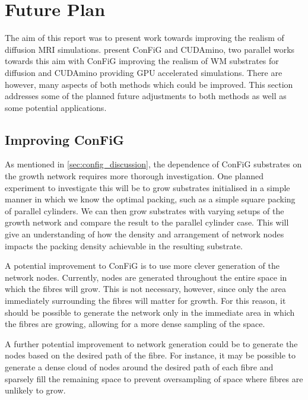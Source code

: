 \chapter{Future Plan}
\label{sec:future}

The aim of this report was to present work towards improving the realism of diffusion MRI simulations.
 present \ac{ConFiG} and CUDAmino, two parallel works towards this aim with \ac{ConFiG} improving the realism of \ac{WM} substrates for diffusion and CUDAmino providing \ac{GPU} accelerated simulations.
There are however, many aspects of both methods which could be improved.
This section addresses some of the planned future adjustments to both methods as well as some potential applications. 

\section{Improving ConFiG}
\label{sec:future_config}

As mentioned in \ref{sec:config_discussion}, the dependence of \ac{ConFiG} substrates on the growth network requires more thorough investigation.
One planned experiment to investigate this will be to grow substrates initialised in a simple manner in which we know the optimal packing, such as a simple square packing of parallel cylinders.
We can then grow substrates with varying setups of the growth network and compare the result to the parallel cylinder case.
This will give an understanding of how the density and arrangement of network nodes impacts the packing density achievable in the resulting substrate.


A potential improvement to \ac{ConFiG} is to use more clever generation of the network nodes. Currently, nodes are generated throughout the entire space in which the fibres will grow.
This is not necessary, however, since only the area immediately surrounding the fibres will matter for growth.
For this reason, it should be possible to generate the network only in the immediate area in which the fibres are growing, allowing for a more dense sampling of the space.

A further potential improvement to network generation could be to generate the nodes based on the desired path of the fibre.
For instance, it may be possible to generate a dense cloud of nodes around the desired path of each fibre and sparsely fill the remaining space to prevent oversampling of space where fibres are unlikely to grow.

